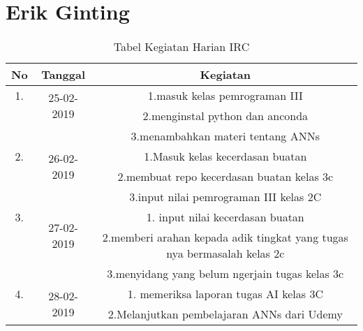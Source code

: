 \chapter{Erik Ginting}

\begin{table}[h]
\caption{Tabel Kegiatan Harian IRC}
\centering
\begin{tabular}{|c|c|c|}
\hline
No&Tanggal&Kegiatan\\
\hline
1.&\multirow{2}{*}{25-02-2019}&1.masuk kelas pemrograman III\\
&&2.menginstal python dan anconda\\
&&3.menambahkan materi tentang ANNs\\
\hline
2.&\multirow{2}{*}{26-02-2019}&1.Masuk kelas kecerdasan buatan\\
&&2.membuat repo kecerdasan buatan kelas 3c\\
&&3.input nilai pemrograman III kelas 2C\\
\hline
3.&\multirow{2}{*}{27-02-2019}&1. input nilai kecerdasan buatan\\
&&2.memberi arahan kepada adik tingkat yang tugas nya bermasalah kelas 2c\\
&&3.menyidang yang belum ngerjain tugas kelas 3c\\
\hline
4.&\multirow{2}{*}{28-02-2019}&1. memeriksa laporan tugas AI kelas 3C\\
&&2.Melanjutkan pembelajaran ANNs dari Udemy \\
\hline
\end{tabular}
\label{table:contoh}
\end{table}